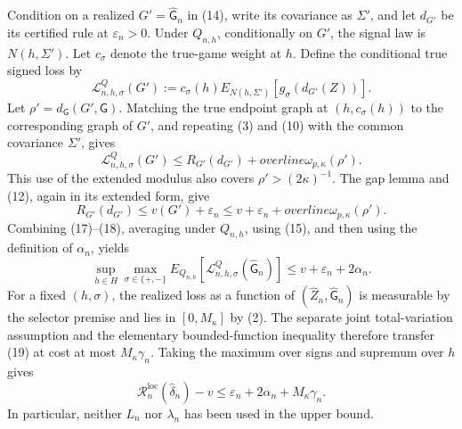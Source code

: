 Condition on a realized \(G'=\widehat{\mathsf G}_n\) in (14), write its covariance as \(\Sigma'\), and let \(d_{G'}\) be its certified rule at \(\varepsilon_n>0\). Under \(Q_{n,h}\), conditionally on \(G'\), the signal law is \(N(h,\Sigma')\). Let \(c_{\sigma}\) denote the true-game weight at \(h\). Define the conditional true signed loss by
\[
 \mathcal L^Q_{n,h,\sigma}(G')
 :=c_{\sigma}(h)
 E_{N(h,\Sigma')}\!\left[g_{\sigma}(d_{G'}(Z))\right]. \tag{16}
\]
Let \(\rho'=d_{\mathsf G}(G',\mathsf G)\). Matching the true endpoint graph at \((h,c_{\sigma}(h))\) to the corresponding graph of \(G'\), and repeating (3) and (10) with the common covariance \(\Sigma'\), gives
\[
 \mathcal L^Q_{n,h,\sigma}(G')
 \leq R_{G'}(d_{G'})+overline\omega_{p,\kappa}(\rho'). \tag{17}
\]
This use of the extended modulus also covers \(\rho'>(2\kappa)^{-1}\). The gap lemma and (12), again in its extended form, give
\[
 R_{G'}(d_{G'})
 \leq v(G')+\varepsilon_n
 \leq v+\varepsilon_n+overline\omega_{p,\kappa}(\rho'). \tag{18}
\]
Combining (17)--(18), averaging under \(Q_{n,h}\), using (15), and then using the definition of \(\alpha_n\), yields
\[
 \sup_{h\in H}\max_{\sigma\in\{+,-\}}
 E_{Q_{n,h}}\!\left[\mathcal L^Q_{n,h,\sigma}
       (\widehat{\mathsf G}_n)\right]
 \leq v+\varepsilon_n+2\alpha_n. \tag{19}
\]
For a fixed \((h,\sigma)\), the realized loss as a function of \((\widehat Z_n,\widehat{\mathsf G}_n)\) is measurable by the selector premise and lies in \([0,M_{\kappa}]\) by (2). The separate joint total-variation assumption and the elementary bounded-function inequality therefore transfer (19) at cost at most \(M_{\kappa}\gamma_n\). Taking the maximum over signs and supremum over \(h\) gives
\[
 \mathcal R_n^{\mathrm{loc}}(\widehat\delta_n)-v
 \leq\varepsilon_n+2\alpha_n+M_{\kappa}\gamma_n. \tag{20}
\]
In particular, neither \(L_n\) nor \(\lambda_n\) has been used in the upper bound.

